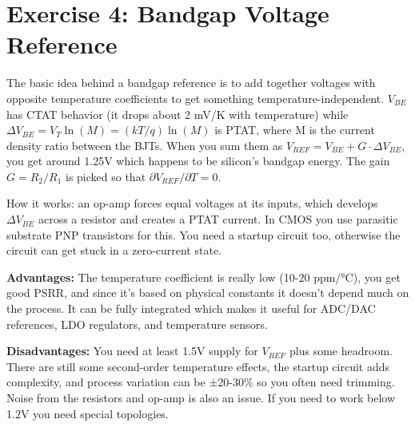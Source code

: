 \documentclass[main.tex]{subfiles}
\begin{document}
\section{Exercise 4: Bandgap Voltage Reference}

The basic idea behind a bandgap reference is to add together voltages with opposite temperature coefficients to get something temperature-independent. $V_{BE}$ has CTAT behavior (it drops about 2 mV/K with temperature) while $\Delta V_{BE} = V_T\ln(M) = (kT/q)\ln(M)$ is PTAT, where M is the current density ratio between the BJTs. When you sum them as $V_{REF} = V_{BE} + G\cdot\Delta V_{BE}$, you get around 1.25V which happens to be silicon's bandgap energy. The gain $G = R_2/R_1$ is picked so that $\partial V_{REF}/\partial T = 0$.

How it works: an op-amp forces equal voltages at its inputs, which develops $\Delta V_{BE}$ across a resistor and creates a PTAT current. In CMOS you use parasitic substrate PNP transistors for this. You need a startup circuit too, otherwise the circuit can get stuck in a zero-current state.

\textbf{Advantages:} The temperature coefficient is really low (10-20 ppm/°C), you get good PSRR, and since it's based on physical constants it doesn't depend much on the process. It can be fully integrated which makes it useful for ADC/DAC references, LDO regulators, and temperature sensors.

\textbf{Disadvantages:} You need at least 1.5V supply for $V_{REF}$ plus some headroom. There are still some second-order temperature effects, the startup circuit adds complexity, and process variation can be ±20-30\% so you often need trimming. Noise from the resistors and op-amp is also an issue. If you need to work below 1.2V you need special topologies.
\end{document}
